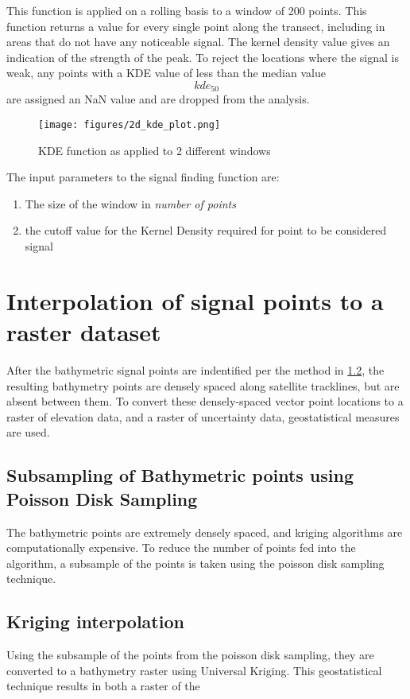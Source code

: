 This function is applied on a rolling basis to a window of 200 points. This function returns a value for every single point along the transect, including in areas that do not have any noticeable signal. The kernel density value gives an indication of the strength of the peak. To reject the locations where the signal is weak, any points with a KDE value of less than the median value $$ kde_{50} $$  are assigned an NaN value and are dropped from the analysis.

\begin{figure}[htbp]
    \centering
    \texttt{[image: figures/2d\_kde\_plot.png]}
    \caption{KDE function as applied to 2 different windows}
    \label{fig:kdefunc}
\end{figure}

The input parameters to the signal finding function are:

\begin{enumerate}
    \item The size of the window in \emph{number of points}
    \item the cutoff value for the Kernel Density required for point to be considered signal
\end{enumerate}

\section{Interpolation of signal points to a raster dataset}

After the bathymetric signal points are indentified per the method in \ref{}, the resulting bathymetry points are densely spaced along satellite tracklines, but are absent between them. To convert these densely-spaced vector point locations to a raster of elevation data, and a raster of uncertainty data, geostatistical measures are used.

\subsection{Subsampling of Bathymetric points using Poisson Disk Sampling} \label{subsec:poissonsubsampling}
The bathymetric points are extremely densely spaced, and kriging algorithms are computationally expensive. To reduce the number of points fed into the algorithm, a subsample of the points is taken using the poisson disk sampling technique. 

\subsection{Kriging interpolation}
Using the subsample of the points from the poisson disk sampling, they are converted to a bathymetry raster using Universal Kriging. This geostatistical technique results in both a raster of the 



